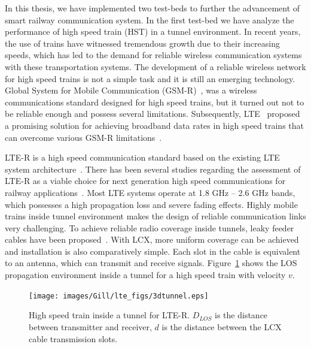 In this thesis, we have implemented two test-beds to further the advancement of smart railway communication system. In the first test-bed we have analyze the performance of high speed train (HST) in a tunnel environment. In recent years, the use of trains have witnessed tremendous growth due to their increasing speeds, which has led to the demand for reliable wireless communication systems with these transportation systems. The development of a reliable wireless network for high speed trains is not a simple task and it is still an emerging technology. Global System for Mobile Communication (GSM-R)~\cite{trlter1}, was a wireless communications standard designed for high speed trains, but it turned out not to be reliable enough and possess several limitations. Subsequently, LTE~\cite{trlter2} proposed a promising solution for achieving broadband data rates in high speed trains that can overcome various GSM-R limitations~\cite{arlter3,inplter4}. 

LTE-R is a high speed communication standard based on the existing LTE system architecture~\cite{inplter4}. There has been several studies regarding the assessment of LTE-R as a viable choice for next generation high speed communications for railway applications~\cite{inplter5,inplter6}. Most LTE systems operate at 1.8 GHz -- 2.6 GHz bands, which possesses a high propagation loss and severe fading effects. Highly mobile trains inside tunnel environment makes the design of reliable communication links very challenging. To achieve reliable radio coverage inside tunnels, leaky feeder cables have been proposed~\cite{arlter7}. With LCX, more uniform coverage can be achieved and installation is also comparatively simple. Each slot in the cable is equivalent to an antenna, which can transmit and receive signals. Figure~\ref{fig:ltertunnel} shows the LOS propagation environment inside a tunnel for a high speed train with velocity $v$.
  
\begin{figure}[!ht]
\label{fig:ltertunnel}
\centering
\texttt{[image: images/Gill/lte\_figs/3dtunnel.eps]} 
\caption{High speed train inside a tunnel for LTE-R. $D_{LOS}$ is the distance between transmitter and receiver, $d$ is the distance between the LCX cable transmission slots.}
\end{figure}

